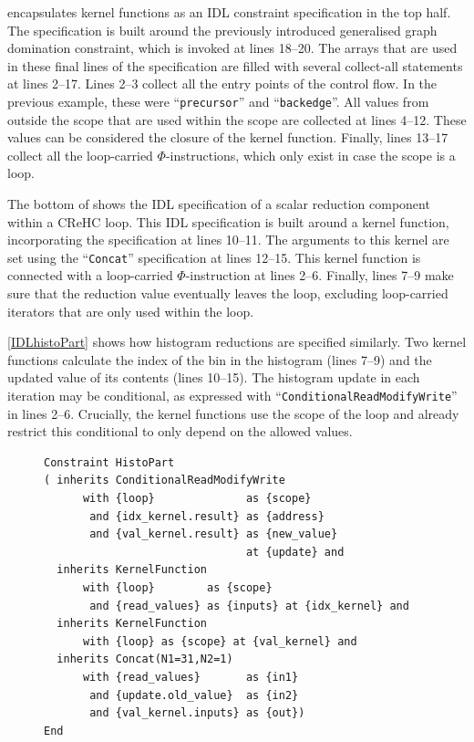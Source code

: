      encapsulates kernel functions as an IDL constraint
    specification in the top half.
    The specification is built around the previously introduced generalised
    graph domination constraint, which is invoked at lines 18--20.
    The arrays that are used in these final lines of the specification are
    filled with several collect-all statements at lines 2--17.
    Lines 2--3 collect all the entry points of the control flow.
    In the previous example, these were ``{\tt precursor}'' and
    ``{\tt backedge}''.
    All values from outside the scope that are used within the scope are
    collected at lines 4--12.
    These values can be considered the closure of the kernel function.
    Finally, lines 13--17 collect all the loop-carried $\Phi$-instructions,
    which only exist in case the scope is a loop.

    The bottom of  shows the IDL specification of a
    scalar reduction component within a CReHC loop.
    This IDL specification is built around a kernel function, incorporating the
    specification at lines 10--11.
    The arguments to this kernel are set using the ``{\tt Concat}''
    specification at lines 12--15.
    This kernel function is connected with a loop-carried $\Phi$-instruction
    at lines 2--6.
    Finally, lines 7--9 make sure that the reduction value eventually leaves the
    loop, excluding loop-carried iterators that are only used within the loop.

    \autoref{IDLhistoPart} shows how histogram reductions are specified
    similarly.
    Two kernel functions calculate the index of the bin in the histogram
    (lines 7--9) and the updated value of its contents (lines 10--15).
    The histogram update in each iteration may be conditional, as expressed with
    ``{\tt ConditionalReadModifyWrite}'' in lines 2--6.
    Crucially, the kernel functions use the scope of the loop and already
    restrict this conditional to only depend on the allowed values.

\begin{figure}[H]
\begin{lstlisting}[language=IDL,label={IDLhistoPart},caption=
   {IDL specification of a histogram reduction in a Complex Reduction and
    Histogram Computation:
    Two kernel functions are present.
    Lines 7--9 calculate the index into the histogram array, lines 10--11
    generate the updated value.
    The read-modify-write step may be conditional.}]
Constraint HistoPart
( inherits ConditionalReadModifyWrite
      with {loop}              as {scope}
       and {idx_kernel.result} as {address}
       and {val_kernel.result} as {new_value}
                               at {update} and
  inherits KernelFunction
      with {loop}        as {scope}
       and {read_values} as {inputs} at {idx_kernel} and
  inherits KernelFunction
      with {loop} as {scope} at {val_kernel} and
  inherits Concat(N1=31,N2=1)
      with {read_values}       as {in1}
       and {update.old_value}  as {in2}
       and {val_kernel.inputs} as {out})
End
\end{lstlisting}
\end{figure}

